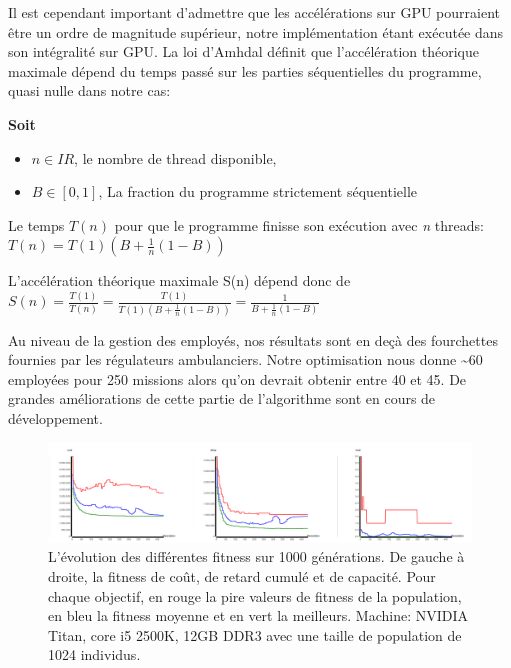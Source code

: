\documentclass[french, 11pt]{memoir}
\begin{document}
Il est cependant important d'admettre que les accélérations sur GPU
pourraient être un ordre de magnitude supérieur\cite{pospichal2010parallel}, notre implémentation
étant exécutée dans son intégralité sur GPU. La loi d'Amhdal\cite{hill2008amdahl} définit que
l'accélération théorique maximale dépend du temps passé sur les parties
séquentielles du programme, quasi nulle dans notre cas:

\bigskip
\textbf{Soit}
\begin{itemize}
\item
 $ n \in I\!R$, le nombre de thread disponible,
\item
  $B\in [0, 1]$, La fraction du programme strictement séquentielle
\end{itemize}

\bigskip 
Le temps $T \left(n \right)$ pour que le programme finisse son exécution
avec \textit{n} threads:\\

$T(n) = T(1) \left(B + \frac{1}{n}\left(1 - B\right)\right)$

\bigskip
L'accélération théorique maximale S(n) dépend donc de \\

$S(n) = \frac{ T\left(1\right)}{T\left(n\right)} =
\frac{T\left(1\right)}{T\left(1\right)\left(B + \frac{1}{n}\left(1 - B\right)\right) }
= \frac{1}{B + \frac{1}{n}\left(1-B\right)}$

\bigskip
Au niveau de la gestion des employés, nos résultats sont en deçà des
fourchettes fournies par les régulateurs ambulanciers. Notre
optimisation nous donne \textasciitilde{}60 employées pour 250 missions
alors qu'on devrait obtenir entre 40 et 45. De grandes améliorations de
cette partie de l'algorithme sont en cours de développement.

\begin{figure}[htbp]
	\begin{center}
		\includegraphics[width=6in]{img/stat}
		\caption{L'évolution des différentes fitness sur 1000 générations. De gauche à droite, la fitness de coût, de retard cumulé et de capacité. Pour chaque objectif, en rouge la pire valeurs de fitness de la population, en bleu la fitness moyenne et en vert la meilleurs.
	    Machine: NVIDIA Titan, core i5 2500K, 12GB DDR3 avec une taille de population de 1024 individus.}
	\end{center}
\end{figure}
\end{document}
